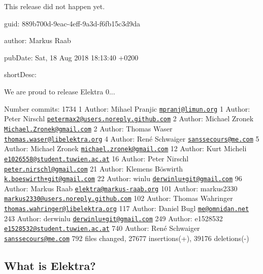 This release did not happen yet.


\begin{DoxyItemize}
\item guid\+: 889b700d-\/9eac-\/4eff-\/9a3d-\/f6fb15c3d9da
\item author\+: Markus Raab
\item pub\+Date\+: Sat, 18 Aug 2018 18\+:13\+:40 +0200
\item short\+Desc\+:
\end{DoxyItemize}

We are proud to release Elektra 0...

Number commits\+: 1734 1 Author\+: Mihael Pranjic \href{mailto:mpranj@limun.org}{\tt mpranj@limun.\+org} 1 Author\+: Peter Nirschl \href{mailto:petermax2@users.noreply.github.com}{\tt petermax2@users.\+noreply.\+github.\+com} 2 Author\+: Michael Zronek \href{mailto:Michael.Zronek@gmail.com}{\tt Michael.\+Zronek@gmail.\+com} 2 Author\+: Thomas Waser \href{mailto:thomas.waser@libelektra.org}{\tt thomas.\+waser@libelektra.\+org} 4 Author\+: René Schwaiger \href{mailto:sanssecours@me.com}{\tt sanssecours@me.\+com} 5 Author\+: Michael Zronek \href{mailto:michael.zronek@gmail.com}{\tt michael.\+zronek@gmail.\+com} 12 Author\+: Kurt Micheli \href{mailto:e1026558@student.tuwien.ac.at}{\tt e1026558@student.\+tuwien.\+ac.\+at} 16 Author\+: Peter Nirschl \href{mailto:peter.nirschl@gmail.com}{\tt peter.\+nirschl@gmail.\+com} 21 Author\+: Klemens Böswirth \href{mailto:k.boeswirth+git@gmail.com}{\tt k.\+boeswirth+git@gmail.\+com} 22 Author\+: winlu \href{mailto:derwinlu+git@gmail.com}{\tt derwinlu+git@gmail.\+com} 96 Author\+: Markus Raab \href{mailto:elektra@markus-raab.org}{\tt elektra@markus-\/raab.\+org} 101 Author\+: markus2330 \href{mailto:markus2330@users.noreply.github.com}{\tt markus2330@users.\+noreply.\+github.\+com} 102 Author\+: Thomas Wahringer \href{mailto:thomas.wahringer@libelektra.org}{\tt thomas.\+wahringer@libelektra.\+org} 117 Author\+: Daniel Bugl \href{mailto:me@omnidan.net}{\tt me@omnidan.\+net} 243 Author\+: derwinlu \href{mailto:derwinlu+git@gmail.com}{\tt derwinlu+git@gmail.\+com} 249 Author\+: e1528532 \href{mailto:e1528532@student.tuwien.ac.at}{\tt e1528532@student.\+tuwien.\+ac.\+at} 740 Author\+: René Schwaiger \href{mailto:sanssecours@me.com}{\tt sanssecours@me.\+com} 792 files changed, 27677 insertions(+), 39176 deletions(-\/)

\subsection*{What is Elektra?}

